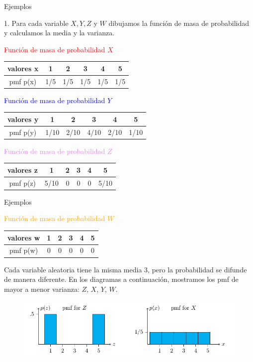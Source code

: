 \documentclass[10pt]{beamer}
\begin{document}
\begin{frame}{Ejemplos}
\small{1.  Para cada variable $X, Y, Z$ y $W$ dibujamos la funci\'on de masa de probabilidad y calculamos la media y la varianza.

\begin{flushleft}
\textcolor{red}{Funci\'on de masa de probabilidad $X$}
 \begin{table}[]
 	\begin{tabular}{c|ccccc}
 		valores  x & 1   & 2   & 3    & 4    & 5   \\
 		\hline
 		pmf p(x)   & 1/5 & 1/5 & 1/5 & 1/5 & 1/5
 	\end{tabular}
 \end{table}
 \textcolor{blue}{Funci\'on de masa de probabilidad $Y$}
 \begin{table}[]
 	\begin{tabular}{c|ccccc}
 		valores  y & 1   & 2   & 3    & 4    & 5   \\
 		\hline
 		pmf p(y)   & 1/10 & 2/10 & 4/10 & 2/10 & 1/10
 	\end{tabular}
 \end{table}
 \textcolor{violet}{Funci\'on de masa de probabilidad $Z$}
 \begin{table}[]
 	\begin{tabular}{c|ccccc}
 		valores  z & 1   & 2   & 3    & 4    & 5   \\
 		\hline
 		pmf p(z)   & 5/10 & 0 & 0 & 0 & 5/10
 	\end{tabular}
 \end{table}
 
\end{flushleft}
}
\end{frame}

\begin{frame}{Ejemplos}
\begin{flushleft}
\textcolor{orange}{Funci\'on de masa de probabilidad $W$}
\begin{table}[]
	
	\begin{tabular}{c|ccccc}
		valores  w & 1   & 2   & 3    & 4    & 5   \\
		\hline
		pmf p(w)   & 0 & 0 & 0 & 0 & 0
	\end{tabular}
\end{table}
\end{flushleft}

\small{Cada variable aleatoria tiene la misma media $3$, pero la probabilidad se difunde de manera diferente. En los diagramas a continuaci\'on, mostramos los pmf de mayor a menor varianza: $Z$, $X$, $Y$, $W$.
	
	
	\begin{figure}[ht]
		\centering
		\includegraphics[scale=.35]{J2.png}
	\end{figure}	
	}
\end{frame}
\end{document}
